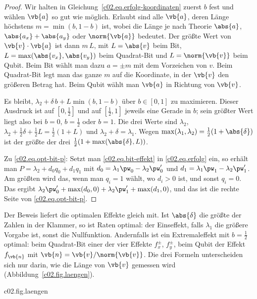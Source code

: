 \begin{proof}
  Wir halten in Gleichung~\eqref{c02.eq.erfolg-koordinaten} zuerst $b$ fest und wählen
  $\vb{a}$ so gut wie möglich. Erlaubt sind alle $\vb{a}$, deren Länge höchstens
  $m = \min(b, 1-b)$ ist, wobei die Länge je nach Theorie $\abs{a}$,
  $\abs{a_x} + \abs{a_y}$ oder $\norm{\vb{a}}$ bedeutet. Der größte Wert von
  $\vb{v}\cdot\vb{a}$ ist dann $m\, L$, mit $L = \abs{v}$ beim Bit,
  $L = \max(\abs{v_x}, \abs{v_y})$ beim Quadrat-Bit und $L = \norm{\vb{v}}$ beim Qubit.
  Beim Bit wählt man dazu $a = \pm m$ mit dem Vorzeichen von $v$. Beim Quadrat-Bit legt man
  das ganze $m$ auf die Koordinate, in der $\vb{v}$ den größeren Betrag hat. Beim Qubit
  wählt man $\vb{a}$ in Richtung von $\vb{v}$.

  Es bleibt, $\lambda_2 + \delta\, b + L \min(b, 1-b)$ über $b \in [0,1]$ zu maximieren.
  Dieser Ausdruck ist auf $[0, \tfrac12]$ und auf $[\tfrac12, 1]$ jeweils eine Gerade in
  $b$; sein größter Wert liegt also bei $b = 0$, $b = \tfrac12$ oder $b = 1$. Die drei
  Werte sind $\lambda_2$, $\lambda_2 + \tfrac12\delta + \tfrac12 L = \tfrac12(1 + L)$ und
  $\lambda_2 + \delta = \lambda_1$. Wegen
  $\max(\lambda_1, \lambda_2) = \tfrac12(1 + \abs{\delta})$ ist der größte der drei
  $\tfrac12(1 + \max(\abs{\delta}, L))$.

  Zu \eqref{c02.eq.opt-bit-p}: Setzt man \eqref{c02.eq.bit-effekt} in
  \eqref{c02.eq.erfolg} ein, so erhält man $P = \lambda_2 + d_0 q_0 + d_1 q_1$ mit
  $d_0 = \lambda_1 \pw_0 - \lambda_2 \pw'_0$ und $d_1 = \lambda_1 \pw_1 - \lambda_2 \pw'_1$.
  Am größten wird das, wenn man $q_i = 1$ wählt, wo $d_i > 0$ ist, und sonst $q_i = 0$.
  Das ergibt $\lambda_2 \pw'_0 + \max(d_0, 0) + \lambda_2 \pw'_1 + \max(d_1, 0)$, und das ist
  die rechte Seite von \eqref{c02.eq.opt-bit-p}.
\end{proof}

Der Beweis liefert die optimalen Effekte gleich mit. Ist $\abs{\delta}$ die größte der
Zahlen in der Klammer, so ist Raten optimal: der Einseffekt, falls $\lambda_1$ die größere
Vorgabe ist, sonst die Nullfunktion. Andernfalls ist ein Extremaleffekt mit $b = \tfrac12$
optimal: beim Quadrat-Bit einer der vier Effekte $f_x^{\pm}$, $f_y^{\pm}$, beim Qubit der
Effekt $f_{\vb{n}}$ mit $\vb{n} = \vb{v}/\norm{\vb{v}}$. Die drei Formeln unterscheiden sich
nur darin, wie die Länge von $\vb{v}$ gemessen wird (Abbildung~\ref{c02.fig.laengen}).

\begin{tpcfigure}{c02.fig.laengen}
  \caption{Wie gut lässt sich ein Zustand $x_1$ vom Mittelpunkt $x_2$ des Zustandsraums
    unterscheiden, wenn beide gleich oft präpariert werden? Nach
    Proposition~\ref{c02.prop.optimum} ist dann $P_{\mathrm{opt}} = \tfrac12 + \tfrac14 L$,
    wobei $L$ die Länge des Ortsvektors von $x_1$ in der jeweiligen Theorie ist.
    Eingetragen sind die Orte von $x_1$ mit $P_{\mathrm{opt}} = \tfrac58$ und
    $P_{\mathrm{opt}} = \tfrac34$: (a) Punkte, (b) Quadrate, (c) Kreise. Mehr als
    $\tfrac34$ ist gegen den Mittelpunkt in keiner der drei Theorien zu erreichen.}
\end{tpcfigure}

